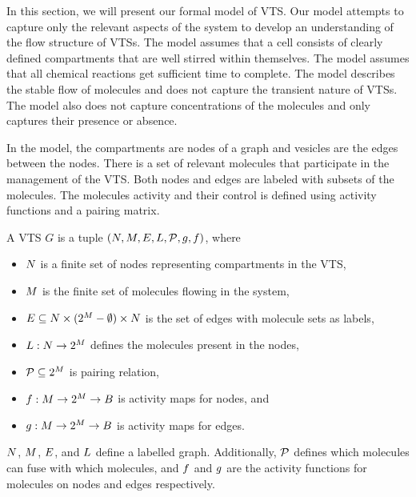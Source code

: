 \noindent In this section, we will present our formal model of VTS.
%
Our model attempts to capture only the relevant aspects of the
system to develop an understanding of the flow structure of VTSs.
%
The model assumes that a cell consists of clearly defined compartments
that are well stirred within themselves.
%
The model assumes that all chemical reactions get sufficient time to complete.
%
The model describes the stable flow of molecules and does not
capture the transient nature of VTSs.
%
The model also does not capture concentrations of the molecules and
only captures their presence or absence.
%

In the model, the compartments are nodes of a graph
and vesicles are the edges between the nodes.
%
There is a set of relevant molecules that participate in the management of the VTS.
%
Both nodes and edges are labeled with subsets of the molecules.
%
The molecules activity and their control is defined using
activity functions and a pairing matrix.
%

\begin{df}
  A VTS $G$ is a tuple $(N,M,E,L,\mathcal{P},g,f)$, where
  \begin{itemize}
  \item $N$ is a finite set of nodes representing compartments in the VTS,
  \item $M$ is the finite set of molecules flowing in the system, 
  \item $E \subseteq N \times (2^{M}-\emptyset) \times N$ is the
    set of edges with molecule sets as labels,
  \item $L : N \rightarrow 2^{M}$ defines the molecules present in the nodes,
  \item $\mathcal{P} \subseteq 2^{M}$ is pairing relation,
  \item $f : M \rightarrow 2^{M} \rightarrow B$ is activity maps for nodes, and
 \item $g : M \rightarrow 2^{M} \rightarrow B$ is activity maps for edges.
  \end{itemize}
\end{df}
$N$, $M$, $E$, and $L$ define a labelled graph.
%
Additionally, $\mathcal{P}$ defines which molecules can fuse with which molecules,
and
$f$ and $g$ are the activity functions for molecules on
nodes and edges respectively.
%

